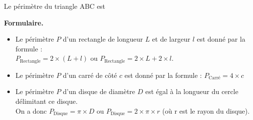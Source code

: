 \begin{Exemple}
\vspace{-0.3cm}
\begin{minipage}{0.55\textwidth}
Le périmètre du triangle ABC est  

\ligne


\end{minipage} \hfill
\begin{minipage}{0.4\textwidth}
\begin{center}
\end{center}
\end{minipage} 

\end{Exemple}


\begin{Propriété}[c] \textbf{Formulaire.}
\begin{itemize}[label=\textcolor{Couleur1}{$\bullet$}]
\item Le périmètre $P$ d'un rectangle de longueur $L$ et de largeur $l$ est donné par la formule :\\
 $P_{\text{Rectangle}} = 2 \times (L + l)$ ou $P_{\text{Rectangle}} = 2 \times L + 2 \times l$.

\item Le périmètre $P$ d'un carré de côté $c$ est donné par la formule :  $P_{\text{Carré}}=4 \times c$

\item Le périmètre $P$ d'un disque de diamètre $D$ est égal à la longueur du cercle délimitant ce disque. \\
On a donc $P_{\text{Disque}} = \pi \times D$  ou $P_{\text{Disque}} = 2 \times \pi \times r$ (où r est le rayon du disque).
\end{itemize}
\end{Propriété}

